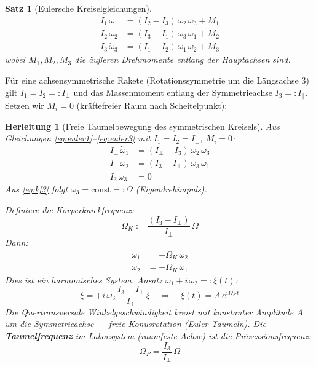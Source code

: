 ﻿\documentclass[12pt,a4paper]{article}
\newtheorem{satz}{Satz}[section]
\newtheorem{herleitung}{Herleitung}[section]
\begin{document}
\begin{satz}[Eulersche Kreiselgleichungen]
\begin{align}
  I_1\,\dot{\omega}_1 &= (I_2 - I_3)\,\omega_2\,\omega_3 + M_1
  \label{eq:euler1}\\
  I_2\,\dot{\omega}_2 &= (I_3 - I_1)\,\omega_3\,\omega_1 + M_2
  \label{eq:euler2}\\
  I_3\,\dot{\omega}_3 &= (I_1 - I_2)\,\omega_1\,\omega_2 + M_3
  \label{eq:euler3}
\end{align}
wobei $M_1, M_2, M_3$ die äußeren Drehmomente entlang der Hauptachsen sind.
\end{satz}

Für eine achsensymmetrische Rakete (Rotationssymmetrie um die Längsachse 3) gilt
$I_1 = I_2 =: I_\perp$ und das Massenmoment entlang der Symmetrieachse
$I_3 =: I_\parallel$. Setzen wir $M_i = 0$ (kräftefreier Raum nach Scheitelpunkt):

\begin{herleitung}[Freie Taumelbewegung des symmetrischen Kreisels]
Aus Gleichungen \eqref{eq:euler1}--\eqref{eq:euler3} mit $I_1=I_2=I_\perp$, $M_i=0$:
\begin{align}
  I_\perp\,\dot{\omega}_1 &= (I_\perp - I_3)\,\omega_2\,\omega_3 \label{eq:kf1}\\
  I_\perp\,\dot{\omega}_2 &= (I_3 - I_\perp)\,\omega_3\,\omega_1 \label{eq:kf2}\\
  I_3\,\dot{\omega}_3     &= 0 \label{eq:kf3}
\end{align}
Aus \eqref{eq:kf3} folgt $\omega_3 = \mathrm{const} =: \Omega$ (Eigendrehimpuls).

Definiere die \emph{Körperknickfrequenz}:
\[
  \Omega_K := \frac{(I_3 - I_\perp)}{{I_\perp}}\,\Omega
\]
Dann:
\begin{align}
  \dot{\omega}_1 &= -\Omega_K\,\omega_2 \label{eq:harm1}\\
  \dot{\omega}_2 &= +\Omega_K\,\omega_1 \label{eq:harm2}
\end{align}
Dies ist ein harmonisches System. Ansatz $\omega_1 + i\,\omega_2 =: \xi(t)$:
\[
  \dot{\xi} = +i\,\omega_3\,\frac{I_3-I_\perp}{I_\perp}\,\xi
  \quad\Rightarrow\quad
  \xi(t) = A\,e^{i\Omega_K t}
\]
Die Quertransversale Winkelgeschwindigkeit \emph{kreist mit konstanter Amplitude $A$}
um die Symmetrieachse --- freie Konusrotation (Euler-Taumeln). Die
\textbf{Taumelfrequenz} im Laborsystem (raumfeste Achse) ist die
\emph{Präzessionsfrequenz}:
\[
  \boxed{\Omega_P = \frac{I_3}{I_\perp}\,\Omega}
\]
\end{herleitung}
\end{document}
